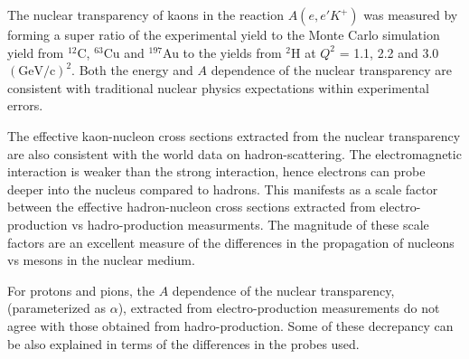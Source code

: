 %
\label{Conclusion}
The nuclear transparency of kaons in the reaction $A(e,e'K^+)$ was measured by forming a super ratio of the experimental yield to the Monte Carlo simulation yield from $^{12}$C, $^{63}$Cu and $^{197}$Au to the yields from $^{2}$H at $Q^2$ = 1.1, 2.2 and 3.0 $(\mathrm{GeV/c})^2$. 
Both the energy and $A$ dependence of the nuclear transparency are consistent with traditional nuclear physics expectations within experimental errors. 

The effective kaon-nucleon cross sections extracted from the nuclear transparency are also consistent with the world data on hadron-scattering. The electromagnetic interaction is weaker than the strong interaction, hence electrons can probe deeper into the nucleus compared to hadrons. This manifests as a scale factor between the effective hadron-nucleon cross sections extracted from electro-production vs hadro-production measurments. The magnitude of these scale factors are an excellent measure of the differences in the propagation of nucleons vs mesons in the nuclear medium.

For protons and pions, the $A$ dependence of the nuclear transparency, (parameterized as $\alpha$), extracted from electro-production  measurements do not agree with those obtained from hadro-production. Some of these decrepancy can be also explained in terms of the differences in the probes used.

